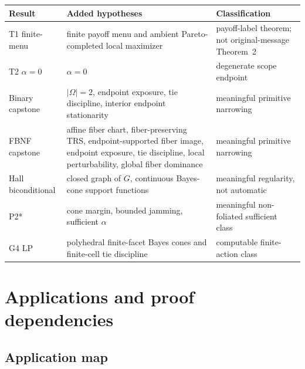 \documentclass[11pt]{article}
\theoremstyle{definition}
\theoremstyle{remark}
\newcommand{\Om}{\Omega}
\begin{document}
\begin{center}
\begin{tabular}{|p{}|p{}|p{}|}
\hline
Result & Added hypotheses & Classification \\
\hline
T1 finite-menu & finite payoff menu and ambient Pareto-completed local maximizer & payoff-label theorem; not original-message Theorem~2 \\
\hline
T2 $\alpha=0$ & $\alpha=0$ & degenerate scope endpoint \\
\hline
Binary capstone & $|\Om|=2$, endpoint exposure, tie discipline, interior endpoint stationarity & meaningful primitive narrowing \\
\hline
FBNF capstone & affine fiber chart, fiber-preserving TRS, endpoint-supported fiber image, endpoint exposure, tie discipline, local perturbability, global fiber dominance & meaningful primitive narrowing \\
\hline
Hall biconditional & closed graph of $G$, continuous Bayes-cone support functions & meaningful regularity, not automatic \\
\hline
P2* & cone margin, bounded jamming, sufficient $\alpha$ & meaningful non-foliated sufficient class \\
\hline
G4 LP & polyhedral finite-facet Bayes cones and finite-cell tie discipline & computable finite-action class \\
\hline
\end{tabular}
\end{center}

\section{Applications and proof dependencies}\label{sec:apps}

\subsection{Application map}
\end{document}
